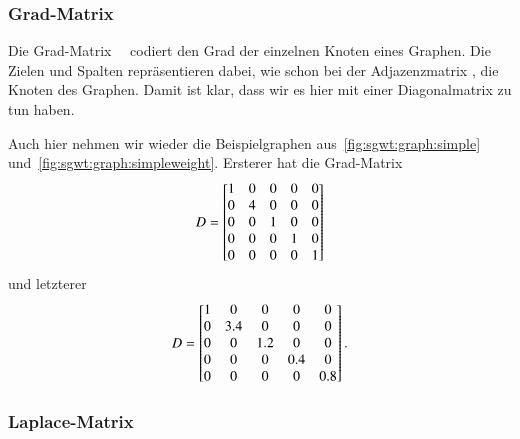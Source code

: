 \subsubsection{Grad-Matrix \texorpdfstring{\degreeM{}}{D}}

Die Grad-Matrix~\degreeM{}~\cite{noauthor_degree_2018} codiert den Grad der 
einzelnen Knoten eines Graphen. Die Zielen und Spalten repr\"asentieren dabei, 
wie schon bei der Adjazenzmatrix \adjacencyM{}, die Knoten des Graphen. Damit 
ist klar, dass wir es hier mit einer Diagonalmatrix zu tun haben.

Auch hier nehmen wir wieder die Beispielgraphen 
aus~\cref{fig:sgwt:graph:simple} und~\cref{fig:sgwt:graph:simpleweight}. 
Ersterer hat die Grad-Matrix
\begin{equation*}
\degreeM =
\begin{bmatrix}
1 & 0 & 0 & 0 & 0 \\
0 & 4 & 0 & 0 & 0 \\
0 & 0 & 1 & 0 & 0 \\
0 & 0 & 0 & 1 & 0 \\
0 & 0 & 0 & 0 & 1
\end{bmatrix}
\end{equation*}
und letzterer
\begin{equation*}
\degreeM =
\begin{bmatrix}
1 & 0 & 0 & 0 & 0 \\
0 & 3.4 & 0 & 0 & 0 \\
0 & 0 & 1.2 & 0 & 0 \\
0 & 0 & 0 & 0.4 & 0 \\
0 & 0 & 0 & 0 & 0.8
\end{bmatrix}.
\end{equation*}

\subsubsection{Laplace-Matrix \texorpdfstring{\laplaceL{}}{L}}


